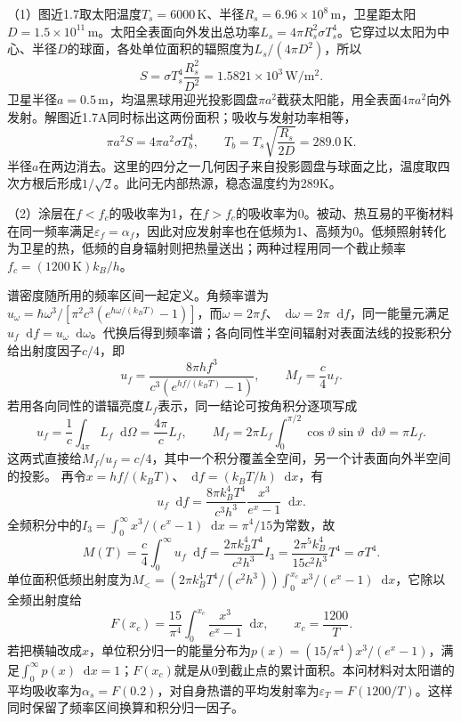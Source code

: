 \documentclass[UTF8,fontset=fandol,a4paper,11pt]{ctexart}
\newcommand{\dd}{\mathop{}\!\mathrm{d}}
\newcommand{\figcaption}[1]{\par\vspace{2pt}{\small\color{muted}#1}\par}
\begin{document}
（1）图近1.7取太阳温度$T_s=6000\,\mathrm K$、半径$R_s=6.96\times10^8\,\mathrm m$，卫星距太阳$D=1.5\times10^{11}\,\mathrm m$。太阳全表面向外发出总功率$L_s=4\pi R_s^2\sigma T_s^4$。它穿过以太阳为中心、半径$D$的球面，各处单位面积的辐照度为$L_s/(4\pi D^2)$，所以
\[
S=\sigma T_s^4\frac{R_s^2}{D^2}=1.5821\times10^3\,\mathrm{W/m^2}.
\]
卫星半径$a=0.5\,\mathrm m$，均温黑球用迎光投影圆盘$\pi a^2$截获太阳能，用全表面$4\pi a^2$向外发射。解图近1.7A同时标出这两份面积；吸收与发射功率相等，
\[
\pi a^2S=4\pi a^2\sigma T_b^4,\qquad
\boxed{T_b=T_s\sqrt{\frac{R_s}{2D}}=289.0\,\mathrm K}.
\]
半径$a$在两边消去。这里的四分之一几何因子来自投影圆盘与球面之比，温度取四次方根后形成$1/\sqrt2$。此问无内部热源，稳态温度约为289K。
\begin{center}\begin{minipage}{.98\linewidth}\centering
{}
\figcaption{解图近1.7A\quad 太阳辐照稀释与卫星的收光、散热面积}
\end{minipage}\end{center}
（2）涂层在$f<f_c$的吸收率为1，在$f>f_c$的吸收率为0。被动、热互易的平衡材料在同一频率满足$\varepsilon_f=\alpha_f$，因此对应发射率也在低频为1、高频为0。低频照射转化为卫星的热，低频的自身辐射则把热量送出；两种过程用同一个截止频率$f_c=(1200\,\mathrm K)k_B/h$。

谱密度随所用的频率区间一起定义。角频率谱为$u_\omega=\hbar\omega^3/[\pi^2c^3(e^{\hbar\omega/(k_BT)}-1)]$，而$\omega=2\pi f$、$\dd\omega=2\pi\dd f$，同一能量元满足$u_f\dd f=u_\omega\dd\omega$。代换后得到频率谱；各向同性半空间辐射对表面法线的投影积分给出射度因子$c/4$，即
\[
u_f=\frac{8\pi hf^3}{c^3(e^{hf/(k_BT)}-1)},\qquad M_f=\frac c4u_f.
\]
若用各向同性的谱辐亮度$L_f$表示，同一结论可按角积分逐项写成
\[
 u_f=\frac1c\int_{4\pi}L_f\dd\Omega=\frac{4\pi}{c}L_f,\qquad
 M_f=2\pi L_f\int_0^{\pi/2}\cos\vartheta\sin\vartheta\dd\vartheta
 =\pi L_f.
\]
这两式直接给$M_f/u_f=c/4$，其中一个积分覆盖全空间，另一个计表面向外半空间的投影。
再令$x=hf/(k_BT)$、$\dd f=(k_BT/h)\dd x$，有
\[
 u_f\dd f=\frac{8\pi k_B^4T^4}{c^3h^3}
 \frac{x^3}{e^x-1}\dd x.
\]
全频积分中的$I_3=\int_0^\infty x^3/(e^x-1)\dd x=\pi^4/15$为常数，故
\[
 M(T)=\frac c4\int_0^\infty u_f\dd f
 =\frac{2\pi k_B^4T^4}{c^2h^3}I_3
 =\frac{2\pi^5k_B^4}{15c^2h^3}T^4
 =\sigma T^4.
\]
单位面积低频出射度为$M_<=(2\pi k_B^4T^4/(c^2h^3))\int_0^{x_c}x^3/(e^x-1)\dd x$，它除以全频出射度给
\[
F(x_c)=\frac{15}{\pi^4}\int_0^{x_c}\frac{x^3}{e^x-1}\dd x,\qquad x_c=\frac{1200}{T}.
\]
若把横轴改成$x$，单位积分归一的能量分布为$p(x)=(15/\pi^4)x^3/(e^x-1)$，满足$\int_0^\infty p(x)\dd x=1$；$F(x_c)$就是从0到截止点的累计面积。本问材料对太阳谱的平均吸收率为$\alpha_s=F(0.2)$，对自身热谱的平均发射率为$\varepsilon_T=F(1200/T)$。这样同时保留了频率区间换算和积分归一因子。
\end{document}
